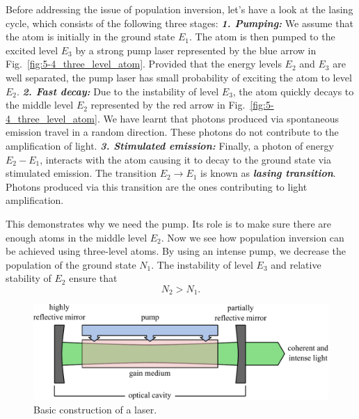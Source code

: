 Before addressing the issue of population inversion, let's have a look at the lasing cycle, which consists of the following three stages:
\newline
\textit{\textbf{1. Pumping:}}
We assume that the atom is initially in the ground state $E_1$.
The atom is then pumped to the excited level $E_3$ by a strong pump laser represented by the blue arrow in Fig.~\ref{fig:5-4_three_level_atom}.
Provided that the energy levels $E_2$ and $E_3$ are well separated, the pump laser has small probability of exciting the atom to level $E_2$.
\newline
\textit{\textbf{2. Fast decay:}}
Due to the instability of level $E_3$, the atom quickly decays to the middle level $E_2$ represented by the red arrow in Fig.~\ref{fig:5-4_three_level_atom}.
We have learnt that photons produced via spontaneous emission travel in a random direction.
These photons do not contribute to the amplification of light.
\newline
\textit{\textbf{3. Stimulated emission:}}
Finally, a photon of energy $E_2-E_1$, interacts with the atom causing it to decay to the ground state via stimulated emission.
The transition $E_2\rightarrow E_1$ is known as \textit{\textbf{lasing transition}}.
Photons produced via this transition are the ones contributing to light amplification.

This demonstrates why we need the pump.
Its role is to make sure there are enough atoms in the middle level $E_2$.
Now we see how population inversion can be achieved using three-level atoms.
By using an intense pump, we decrease the population of the ground state $N_1$.
The instability of level $E_3$ and relative stability of $E_2$ ensure that
\begin{equation}
    N_2 > N_1.
\end{equation}

\begin{figure}[t]
    \centering
    \includegraphics[width=\textwidth]{lesson5/5-4_laser construction.pdf}
    \caption[Laser construction]{Basic construction of a laser.}
    \label{fig:5-4_laser_construction}
\end{figure}

